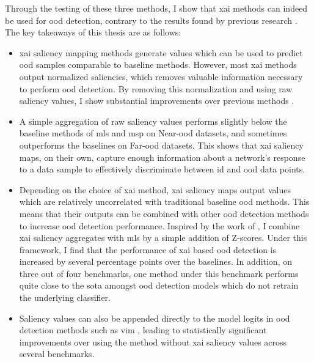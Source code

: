 \documentclass[UKenglish]{uiomasterthesis} %
\theoremstyle{definition}
\begin{document}
Through the testing of these three methods, I show that \ac{xai} methods can indeed be used for \ac{ood} detection, contrary to the results found by previous research \cite{martinez}. The key takeaways of this thesis are as follows:

\begin{itemize}
    \item \ac{xai} saliency mapping methods generate values which can be used to predict \ac{ood} samples comparable to baseline methods. However, most \ac{xai} methods output normalized saliencies, which removes valuable information necessary to perform \ac{ood} detection. By removing this normalization and using raw saliency values, I show substantial improvements over previous methods \cite{martinez}.
    \item A simple aggregation of raw saliency values performs slightly below the baseline methods of \ac{mls} and \ac{msp} on Near-\ac{ood} datasets, and sometimes outperforms the baselines on Far-\ac{ood} datasets. This shows that \ac{xai} saliency maps, on their own, capture enough information about a network's response to a data sample to effectively discriminate between \ac{id} and \ac{ood} data points.%
    \item Depending on the choice of \ac{xai} method, \ac{xai} saliency maps output values which are relatively uncorrelated with traditional baseline \ac{ood} methods. This means that their outputs can be combined with other \ac{ood} detection methods to increase \ac{ood} detection performance. Inspired by the work of \cite{combood}, I combine \ac{xai} saliency aggregates with \ac{mls} by a simple addition of Z-scores. Under this framework, I find that the performance of \ac{xai} based \ac{ood} detection is increased by several percentage points over the baselines. In addition, on three out of four benchmarks, one method under this benchmark performs quite close to the \ac{sota} amongst \ac{ood} detection models which do not retrain the underlying classifier.
    \item Saliency values can also be appended directly to the model logits in \ac{ood} detection methods such as \ac{vim} \cite{vim}, leading to statistically significant improvements over using the method without \ac{xai} saliency values across several benchmarks.
\end{itemize}
\end{document}
